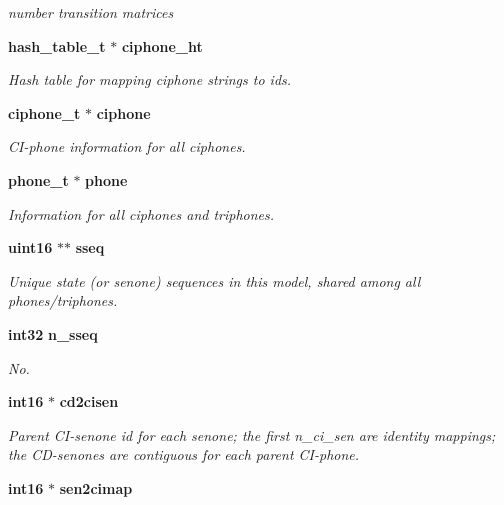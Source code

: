 \begin{DoxyCompactItemize}
\begin{DoxyCompactList}\small\item\em number transition matrices \end{DoxyCompactList}\item 
{\bf hash\-\_\-table\-\_\-t} $\ast$ {\bf ciphone\-\_\-ht}\label{structmdef__t_a1091b9f34193255ccf6038d75523187b}

\begin{DoxyCompactList}\small\item\em \-Hash table for mapping ciphone strings to ids. \end{DoxyCompactList}\item 
{\bf ciphone\-\_\-t} $\ast$ {\bf ciphone}\label{structmdef__t_aae4a51202b87f71394b6c5b3138b77c7}

\begin{DoxyCompactList}\small\item\em \-C\-I-\/phone information for all ciphones. \end{DoxyCompactList}\item 
{\bf phone\-\_\-t} $\ast$ {\bf phone}\label{structmdef__t_a2b9aaf78e5648fe14655d1fe8da5f164}

\begin{DoxyCompactList}\small\item\em \-Information for all ciphones and triphones. \end{DoxyCompactList}\item 
{\bf uint16} $\ast$$\ast$ {\bf sseq}\label{structmdef__t_a2472170a66d451d2d4873a9a6e64adc7}

\begin{DoxyCompactList}\small\item\em \-Unique state (or senone) sequences in this model, shared among all phones/triphones. \end{DoxyCompactList}\item 
{\bf int32} {\bf n\-\_\-sseq}
\begin{DoxyCompactList}\small\item\em \-No. \end{DoxyCompactList}\item 
{\bf int16} $\ast$ {\bf cd2cisen}\label{structmdef__t_ae2ba90b39a79603022daae3c9270a0b7}

\begin{DoxyCompactList}\small\item\em \-Parent \-C\-I-\/senone id for each senone; the first n\-\_\-ci\-\_\-sen are identity mappings; the \-C\-D-\/senones are contiguous for each parent \-C\-I-\/phone. \end{DoxyCompactList}\item 
{\bf int16} $\ast$ {\bf sen2cimap}\label{structmdef__t_a4aafd791a1e1adaa9b5b28bf0cfbd624}


\end{DoxyCompactItemize}
